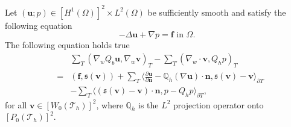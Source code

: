 \documentclass[final,leqno]{siamltex704}
\def\S{{\mathfrak s}}
\def\T{{\mathcal T}}
\begin{document}
\begin{lemma}
Let $(\bm{u};p) \in [H^1(\Omega)]^2\times L^2(\Omega)$ be sufficiently smooth and satisfy the following equation
\begin{equation}\label{Equ.Stokes.1}
-\Delta \bm{u}+ \nabla p =\bm{f}  \text{ in } \Omega.
\end{equation}
The following equation holds true
\begin{eqnarray}\label{equ.lemma.wf}
& & \sum_{T}(\nabla_w Q_b \bm{u},\nabla_w \bm{v})_T - \sum_{T}(\nabla_w\cdot\bm{v}, Q_h p )_{T}\\
&= &(\bm{f}, \S(\bm{v})) + \sum_{T}\langle \frac{\partial \bm{u}}{\partial \bm{n}}- \mathbb{Q}_h(\nabla \bm{u})\cdot\bm{n},\S(\bm{v})-\bm{v}\rangle_{\partial T}\nonumber\\
&& - \sum_{T} \langle (\S(\bm{v})-\bm{v})\cdot \bm{n},p - Q_h p\rangle_{\partial T}, \nonumber
\end{eqnarray}
for all $\bm{v} \in [W_0(\T_h)]^2$, where $\mathbb{Q}_h$ is the $L^2$ projection operator onto $[P_0(\T_h)]^2$.
\end{lemma}
\end{document}

